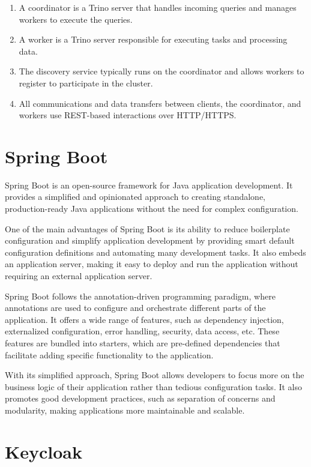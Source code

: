 \begin{enumerate}
\item A coordinator is a Trino server that handles incoming queries and manages workers to execute the queries.
\item A worker is a Trino server responsible for executing tasks and processing data.
\item The discovery service typically runs on the coordinator and allows workers to register to participate in the cluster.
\item All communications and data transfers between clients, the coordinator, and workers use REST-based interactions over HTTP/HTTPS.
\end{enumerate}

\section{Spring Boot}

Spring Boot is an open-source framework for Java application development. It provides a simplified and opinionated approach to creating standalone, production-ready Java applications without the need for complex configuration.

One of the main advantages of Spring Boot is its ability to reduce boilerplate configuration and simplify application development by providing smart default configuration definitions and automating many development tasks. It also embeds an application server, making it easy to deploy and run the application without requiring an external application server.

Spring Boot follows the annotation-driven programming paradigm, where annotations are used to configure and orchestrate different parts of the application. It offers a wide range of features, such as dependency injection, externalized configuration, error handling, security, data access, etc. These features are bundled into starters, which are pre-defined dependencies that facilitate adding specific functionality to the application.

With its simplified approach, Spring Boot allows developers to focus more on the business logic of their application rather than tedious configuration tasks. It also promotes good development practices, such as separation of concerns and modularity, making applications more maintainable and scalable.

\cite{springboot}

\section{Keycloak}

